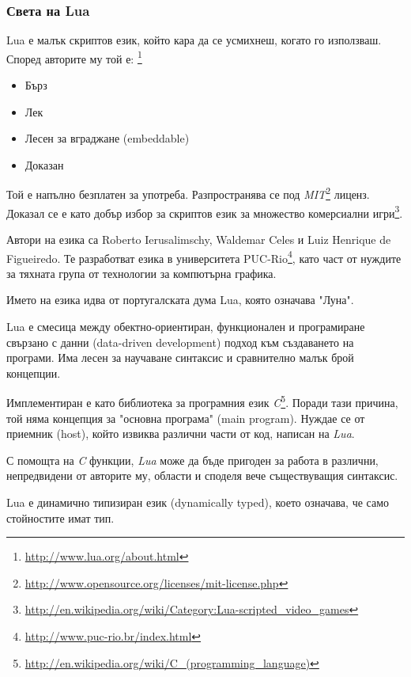 		\subsubsection{Света на Lua}
		
			Lua е малък скриптов език, който кара да се усмихнеш, когато го използваш. 
			Според авторите му той е: \footnote{\url{http://www.lua.org/about.html}} 
			
			\begin{itemize}
				\item Бърз
				\item Лек
				\item Лесен за вграджане (embeddable)
				\item Доказан
			\end{itemize}
			
			Той е напълно безплатен за употреба. Разпространява се под 
			\emph{MIT}\footnote{\url{http://www.opensource.org/licenses/mit-license.php}} лиценз. 
			Доказал се е като добър избор за скриптов език за множество комерсиални 
			игри\footnote{\url{http://en.wikipedia.org/wiki/Category:Lua-scripted_video_games}}.
			
			Автори на езика са Roberto Ierusalimschy, Waldemar Celes и Luiz Henrique de Figueiredo. Те разработват езика в
			университета PUC-Rio\footnote{\url{http://www.puc-rio.br/index.html}}, като част от нуждите за тяхната група
			от технологии за компютърна графика. 
			
			Името на езика идва от португалската дума Lua, която означава "Луна".
			
			Lua е смесица между обектно-ориентиран, функционален и програмиране свързано с данни (data-driven development)
			подход към създаването на програми. Има лесен за научаване синтаксис и сравнително малък брой концепции. 
			
			Имплементиран е като библиотека за програмния език \emph{C}\footnote{\url{http://en.wikipedia.org/wiki/C_(programming_language)}}. 
			Поради тази причина, той няма концепция за "основна програма" (main program). Нуждае се от приемник (host), който извиква различни
			части от код, написан на \emph{Lua}.
			
			С помощта на \emph{C} функции, \emph{Lua} може да бъде пригоден за работа в различни, непредвидени от авторите му,
			области и споделя вече съществуващия синтаксис.
			
				Lua е динамично типизиран език (dynamically typed), което означава, че само стойностите имат тип.
				
